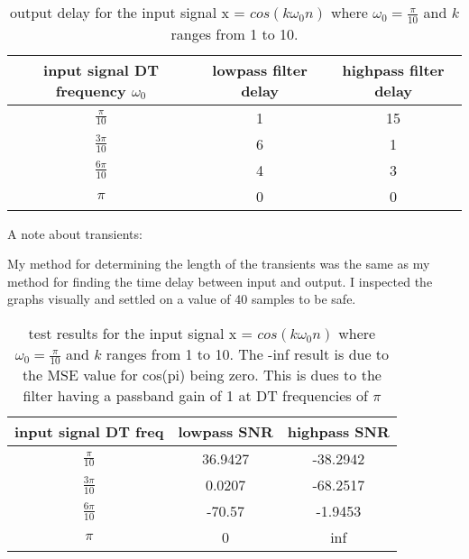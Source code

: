 \documentclass[12pt]{scrartcl} %
\begin{document}
						\begin{table}[H]
				\centering
				\begin{tabular}{||c c c ||} 
					\hline
					input signal DT frequency $\omega_0$ & lowpass filter delay & highpass filter delay  \\ [0.5ex] 
					\hline\hline
					$\frac{\pi}{10}$ & 1 & 15 \\
					\hline
					$\frac{3\pi}{10}$ & 6 & 1\\
					\hline
					$\frac{6\pi}{10}$ & 4 & 3\\
					\hline
					$\pi$ & 0 & 0\\ [1ex] 
					\hline
				\end{tabular}
				\caption{output delay for the input signal x = $cos(k \omega_0 n)$ where $\omega_0 = \frac{\pi}{10}$ and $k$ ranges from 1 to 10.}
			\end{table}	
			
			
				\vspace{5mm}
			
			A note about transients:
			
				\vspace{5mm}
			
			My method for determining the length of the transients was the same as my method for finding the time delay between input and output. I inspected the graphs visually and settled on a 
			value of 40 samples to be safe.
			
			\vspace{5mm}
			
			\begin{table}[H]
			\centering
			\begin{tabular}{||c c c ||} 
				\hline
				input signal DT freq & lowpass SNR & highpass SNR  \\ [0.5ex] 
				\hline\hline
				$\frac{\pi}{10}$ & 36.9427 & -38.2942 \\
				\hline
				$\frac{3\pi}{10}$ & 0.0207 & -68.2517\\
				\hline
				$\frac{6\pi}{10}$ & -70.57 & -1.9453\\
				\hline
				$\pi$ & 0 & inf\\ [1ex] 
				\hline
			\end{tabular}
			\caption{test results for the input signal x = $cos(k \omega_0 n)$ where $\omega_0 = \frac{\pi}{10}$ and $k$ ranges from 1 to 10. The -inf result is due to the MSE value for cos(pi) being zero. This is dues to the filter having a passband gain of 1 at DT frequencies of $\pi$}
		\end{table}	
	 
\end{document}
